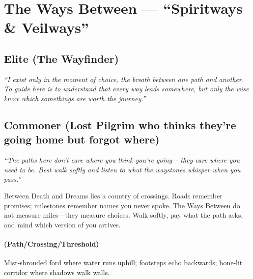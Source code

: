 \section{The Ways Between --- ``Spiritways \& Veilways''}
\label{chap:ways-between}

\subsection*{Elite (The Wayfinder)}
\textit{``I exist only in the moment of choice, the breath between one path and another. To guide here is to understand that every way leads somewhere, but only the wise know which somethings are worth the journey.''}

\subsection*{Commoner (Lost Pilgrim who thinks they're going home but forgot where)}
\textit{``The paths here don't care where you think you're going – they care where you need to be. Best walk softly and listen to what the waystones whisper when you pass.''}

\begin{tcolorbox}[colback=black!3,colframe=black!40!white,title={Theme \& Atmosphere}]
Between Death and Dreams lies a country of crossings. Roads remember promises; milestones remember names you never spoke. The Ways Between do not measure miles---they measure choices. Walk softly, pay what the path asks, and mind which version of you arrives.
\end{tcolorbox}

\paragraph*{(Path/Crossing/Threshold)} Mist-shrouded ford where water runs uphill; footsteps echo backwards; bone-lit corridor where shadows walk walls.

